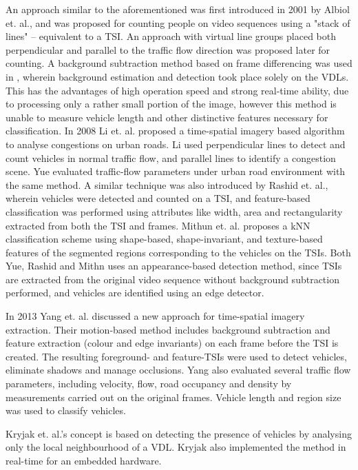 An approach similar to the aforementioned was first introduced in 2001 by Albiol et. al., and was proposed for counting people on video sequences using a "stack of lines" -- equivalent to a TSI\cite{Albiol2001}.
An approach with virtual line groups placed both perpendicular and parallel to the traffic flow direction was proposed later for counting\cite{Anan2006,Wu2007}.
A background subtraction method based on frame differencing was used in \cite{Anan2006, Wu2007}, wherein background estimation and detection took place solely on the VDLs.
This has the advantages of high operation speed and strong real-time ability, due to processing only a rather small portion of the image, however this method is unable to measure vehicle length and other distinctive features necessary for classification.
In 2008 Li et. al. proposed a time-spatial imagery based algorithm to analyse congestions on urban roads.
Li used perpendicular lines to detect and count vehicles in normal traffic flow, and parallel lines to identify a congestion scene\cite{Li2008}.
Yue evaluated traffic-flow parameters under urban road environment with the same method\cite{Yue2009}.
A similar technique was also introduced by Rashid et. al., wherein vehicles were detected and counted on a TSI, and feature-based classification was performed using attributes like width, area and rectangularity extracted from both the TSI and frames\cite{Rashid2010}.
Mithun et. al. proposes a kNN classification scheme using shape-based, shape-invariant, and texture-based features of the segmented regions corresponding to the vehicles on the TSIs\cite{Mithun2012a}.
Both Yue, Rashid and Mithn uses an appearance-based detection method, since TSIs are extracted from the original video sequence without background subtraction performed, and vehicles are identified using an edge detector.

In 2013 Yang et. al. discussed a new approach for time-spatial imagery extraction\cite{Yang2013a}.
Their motion-based method includes background subtraction and feature extraction (colour and edge invariants) on each frame before the TSI is created.
The resulting foreground- and feature-TSIs were used to detect vehicles, eliminate shadows and manage occlusions.
Yang also evaluated several traffic flow parameters, including velocity, flow, road occupancy and density by measurements carried out on the original frames. 
Vehicle length and region size was used to classify vehicles.

Kryjak et. al.'s concept is based on detecting the presence of vehicles by analysing only the local neighbourhood of a VDL.
Kryjak also implemented the method in real-time for an embedded hardware\cite{Kryjak2014}.

